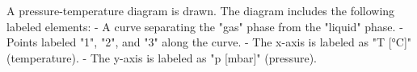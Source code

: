 A pressure-temperature diagram is drawn. The diagram includes the following labeled elements:  
- A curve separating the "gas" phase from the "liquid" phase.  
- Points labeled "1", "2", and "3" along the curve.  
- The x-axis is labeled as "T [°C]" (temperature).  
- The y-axis is labeled as "p [mbar]" (pressure).
